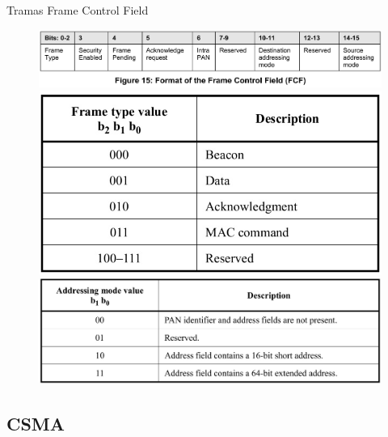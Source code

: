 \documentclass[aspectratio=169]{beamer}
\begin{document}
\begin{frame}[t]{Tramas}
Frame Control Field
	\begin{figure}[H]
	\centering
		\includegraphics[height=.3\textheight]{./imagenes/FCF.jpg}\\
		\vspace{20px}
		\includegraphics[height=.3\textheight]{./imagenes/frametype.jpg}
		\hspace{20px} 
		\includegraphics[height=.3\textheight]{./imagenes/addressingmode.jpg}
	\end{figure} 	
\end{frame}

\subsection[CSMA]{CSMA}
\end{document}
